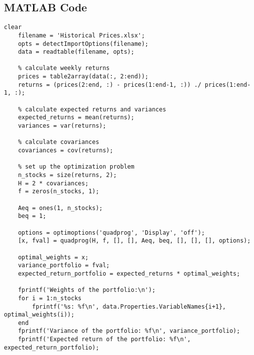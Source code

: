 \documentclass[12pt]{article}
\begin{document}
\subsection{MATLAB Code}

\begin{lstlisting}[label=lst:a,
    caption=Question a)]
    clear
    filename = 'Historical Prices.xlsx';
    opts = detectImportOptions(filename);
    data = readtable(filename, opts);
    
    % calculate weekly returns
    prices = table2array(data(:, 2:end));
    returns = (prices(2:end, :) - prices(1:end-1, :)) ./ prices(1:end-1, :);
    
    % calculate expected returns and variances
    expected_returns = mean(returns);
    variances = var(returns);
    
    % calculate covariances
    covariances = cov(returns);
    
    % set up the optimization problem
    n_stocks = size(returns, 2);
    H = 2 * covariances;
    f = zeros(n_stocks, 1);
    
    Aeq = ones(1, n_stocks);
    beq = 1;
    
    options = optimoptions('quadprog', 'Display', 'off');
    [x, fval] = quadprog(H, f, [], [], Aeq, beq, [], [], [], options);
    
    optimal_weights = x;
    variance_portfolio = fval;
    expected_return_portfolio = expected_returns * optimal_weights;
    
    fprintf('Weights of the portfolio:\n');
    for i = 1:n_stocks
        fprintf('%s: %f\n', data.Properties.VariableNames{i+1}, optimal_weights(i));
    end
    fprintf('Variance of the portfolio: %f\n', variance_portfolio);
    fprintf('Expected return of the portfolio: %f\n', expected_return_portfolio);
\end{lstlisting}
\end{document}
